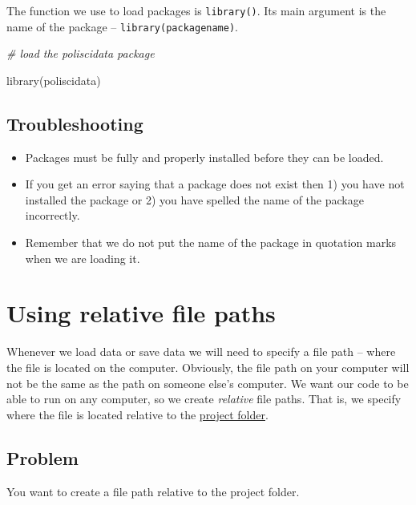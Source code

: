 \documentclass[
]{book}
\newenvironment{Shaded}{\begin{snugshade}}{\end{snugshade}}
\newcommand{\CommentTok}[1]{\textcolor[rgb]{0.56,0.35,0.01}{\textit{#1}}}
\newcommand{\FunctionTok}[1]{\textcolor[rgb]{0.00,0.00,0.00}{#1}}
\newcommand{\NormalTok}[1]{#1}
\providecommand{\tightlist}{%
  \setlength{\itemsep}{0pt}\setlength{\parskip}{0pt}}
\begin{document}
The function we use to load packages is \texttt{library()}. Its main argument is the name of the package -- \texttt{library(packagename)}.

\begin{Shaded}
\begin{Highlighting}[]
\CommentTok{\# load the poliscidata package}

\FunctionTok{library}\NormalTok{(poliscidata)}
\end{Highlighting}
\end{Shaded}

\hypertarget{troubleshooting-5}{%
\subsection{Troubleshooting}\label{troubleshooting-5}}

\begin{itemize}
\tightlist
\item
  Packages must be fully and properly installed before they can be loaded.
\item
  If you get an error saying that a package does not exist then 1) you have not installed the package or 2) you have spelled the name of the package incorrectly.
\item
  Remember that we do not put the name of the package in quotation marks when we are loading it.
\end{itemize}

\hypertarget{relative-path}{%
\section{Using relative file paths}\label{relative-path}}

Whenever we load data or save data we will need to specify a file path -- where the file is located on the computer. Obviously, the file path on your computer will not be the same as the path on someone else's computer. We want our code to be able to run on any computer, so we create \emph{relative} file paths. That is, we specify where the file is located relative to the \protect\hyperlink{project}{project folder}.

\hypertarget{problem-8}{%
\subsection{Problem}\label{problem-8}}

You want to create a file path relative to the project folder.
\end{document}
